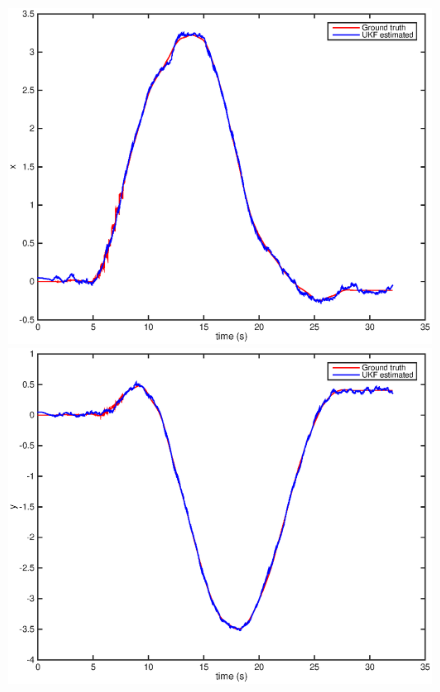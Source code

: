 \documentclass[letter, 10pt]{article}
\begin{document}
\begin{onehalfspacing}
\begin{figure}[h]
	\centering
	\begin{minipage}{.25\textwidth} 
  		\centering
    		\includegraphics[width=1\linewidth]{t_x.eps}
	\end{minipage}%
	\begin{minipage}{.25\textwidth} 
		\centering
    		\includegraphics[width=1\linewidth]{t_y.eps}
	\end{minipage}%
	\begin{minipage}{.25\textwidth}  		
		\centering

\end{minipage}
\end{figure}
\end{onehalfspacing}
\end{document}
